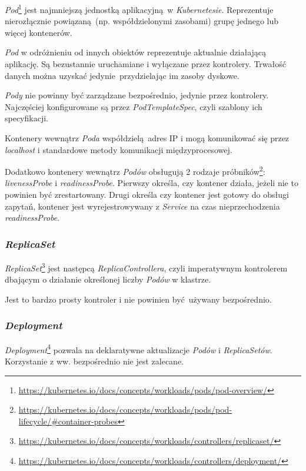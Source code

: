 \documentclass[a4paper,12pt,twoside,openany]{report}
\DeclareRobustCommand{\href}[2]{#2\footnote{\url{#1}}}
\begin{document}
\href{https://kubernetes.io/docs/concepts/workloads/pods/pod-overview/}{\emph{Pod}}
jest najmniejszą jednostką aplikacyjną~w \emph{Kubernetesie}.
Reprezentuje nierozłącznie powiązaną~(np. współdzielonymi zasobami)
grupę jednego lub więcej kontenerów.

\emph{Pod} w odróżnieniu od innych obiektów reprezentuje aktualnie
działającą aplikację. Są bezustannie uruchamiane i wyłączane przez
kontrolery. Trwałość danych można uzyskać jedynie~przydzielając im
zasoby dyskowe.

\emph{Pody} nie powinny być zarządzane bezpośrednio, jedynie przez
kontrolery. Najczęściej konfigurowane są przez \emph{PodTemplateSpec},
czyli szablony ich specyfikacji.

Kontenery wewnątrz \emph{Poda} współdzielą~adres IP i mogą komunikować
się przez \emph{localhost} i standardowe metody komunikacji
międzyprocesowej.

Dodatkowo kontenery wewnątrz \emph{Podów} obsługują 2 rodzaje
\href{https://kubernetes.io/docs/concepts/workloads/pods/pod-lifecycle/\#container-probes}{próbników}:
\emph{livenessProbe} i \emph{readinessProbe}. Pierwszy określa, czy
kontener działa, jeżeli nie to powinien być zrestartowany. Drugi określa
czy kontener jest gotowy do obsługi zapytań, kontener jest
wyrejestrowywany z \emph{Service} na czas nieprzechodzenia
\emph{readinessProbe}.

\hypertarget{replicaset}{%
\subsubsection{\texorpdfstring{\emph{ReplicaSet}}{ReplicaSet}}\label{replicaset}}

\href{https://kubernetes.io/docs/concepts/workloads/controllers/replicaset/}{\emph{ReplicaSet}}
jest następcą \emph{ReplicaControllera}, czyli imperatywnym kontrolerem
dbającym o działanie określonej liczby \emph{Podów} w klastrze.

Jest to bardzo prosty kontroler i nie powinien być~używany bezpośrednio.

\hypertarget{deployment}{%
\subsubsection{\texorpdfstring{\emph{Deployment}}{Deployment}}\label{deployment}}

\href{https://kubernetes.io/docs/concepts/workloads/controllers/deployment/}{\emph{Deployment}}
pozwala na deklaratywne aktualizacje \emph{Podów} i \emph{ReplicaSetów}.
Korzystanie z ww. bezpośrednio nie jest zalecane.
\end{document}
